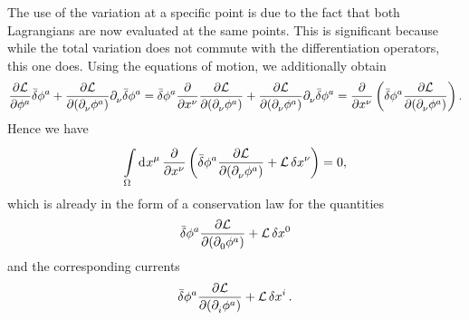 The use of the variation at a specific point is due to the fact that both Lagrangians are now evaluated at the same points. This is significant because while the total variation does not commute with the differentiation operators, this one does. Using the equations of motion, we additionally obtain
\begin{align*}
	\pdv{\ensuremath{\mathcal{L}}}{\phi^{a}}\bar{\delta}\phi^{a} + \pdv{\ensuremath{\mathcal{L}}}{(\partial^{}_{\nu}\phi^{a})}\partial^{}_{\nu}\bar{\delta}\phi^{a} = \bar{\delta}\phi^{a}\pdv{x^{\nu}}\pdv{\ensuremath{\mathcal{L}}}{(\partial^{}_{\nu}\phi^{a})} + \pdv{\ensuremath{\mathcal{L}}}{(\partial^{}_{\nu}\phi^{a})}\partial^{}_{\nu}\bar{\delta}\phi^{a} = \pdv{x^{\nu}}\left(\bar{\delta}\phi^{a}\pdv{\ensuremath{\mathcal{L}}}{(\partial^{}_{\nu}\phi^{a})}\right).
\end{align*}
Hence we have
\begin{align*}
	\int\limits_{\Omega}^{}\dd[]{x^{\mu}}\pdv{x^{\nu}}\left(\bar{\delta}\phi^{a}\pdv{\ensuremath{\mathcal{L}}}{(\partial^{}_{\nu}\phi^{a})} + \mathcal{L}\var{x^{\nu}}\right) = 0,
\end{align*}
which is already in the form of a conservation law for the quantities
\begin{align*}
	\bar{\delta}\phi^{a}\pdv{\ensuremath{\mathcal{L}}}{(\partial^{}_{0}\phi^{a})} + \mathcal{L}\var{x^{0}}
\end{align*}
and the corresponding currents
\begin{align*}
	\bar{\delta}\phi^{a}\pdv{\ensuremath{\mathcal{L}}}{(\partial^{}_{i}\phi^{a})} + \mathcal{L}\var{x^{i}}.
\end{align*}

